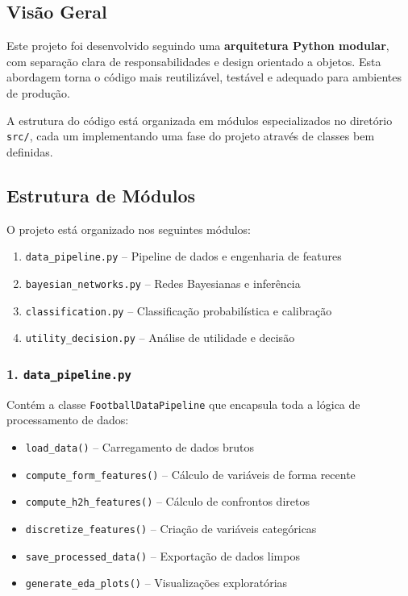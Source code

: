 \documentclass[12pt, a4paper]{article}
\begin{document}
\subsection{Visão Geral}

Este projeto foi desenvolvido seguindo uma \textbf{arquitetura Python modular}, com separação clara de responsabilidades e design orientado a objetos. Esta abordagem torna o código mais reutilizável, testável e adequado para ambientes de produção.

A estrutura do código está organizada em módulos especializados no diretório \texttt{src/}, cada um implementando uma fase do projeto através de classes bem definidas.

\subsection{Estrutura de Módulos}

O projeto está organizado nos seguintes módulos:

\begin{enumerate}
  \item \texttt{data\_pipeline.py} -- Pipeline de dados e engenharia de features
  \item \texttt{bayesian\_networks.py} -- Redes Bayesianas e inferência
  \item \texttt{classification.py} -- Classificação probabilística e calibração
  \item \texttt{utility\_decision.py} -- Análise de utilidade e decisão
\end{enumerate}

\subsubsection{1. \texttt{data\_pipeline.py}}

Contém a classe \texttt{FootballDataPipeline} que encapsula toda a lógica de processamento de dados:

\begin{itemize}
  \item \texttt{load\_data()} -- Carregamento de dados brutos
  \item \texttt{compute\_form\_features()} -- Cálculo de variáveis de forma recente
  \item \texttt{compute\_h2h\_features()} -- Cálculo de confrontos diretos
  \item \texttt{discretize\_features()} -- Criação de variáveis categóricas
  \item \texttt{save\_processed\_data()} -- Exportação de dados limpos
  \item \texttt{generate\_eda\_plots()} -- Visualizações exploratórias
\end{itemize}
\end{document}
